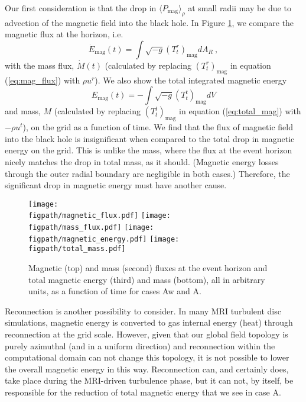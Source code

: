 \documentclass[useAMS,usenatbib]{mn2e}
\newcommand{\figpath}{.}
\def\pm{P_\mathrm{mag}}
\begin{document}
Our first consideration is that the drop in  $\langle \pm \rangle_\rho$ at small radii may be due to advection of the magnetic field into the black hole.  In Figure \ref{fig:fluxes}, we compare the magnetic flux at the horizon, i.e.
\begin{equation}
\dot{E}_\mathrm{mag}(t) = \int \sqrt{-g} (T^r_t)_\mathrm{mag} dA_R ~,
\label{eq:mag_flux}
\end{equation}
with the mass flux, $\dot{M}(t)$ (calculated by replacing $(T^r_t)_\mathrm{mag}$ in equation (\ref{eq:mag_flux}) with $\rho u^r$). We also show the total integrated magnetic energy 
\begin{equation}
E_\mathrm{mag}(t) = -\int \sqrt{-g} (T^t_t)_\mathrm{mag} dV
\label{eq:total_mag}
\end{equation}
and mass, $M$ (calculated by replacing $(T^t_t)_\mathrm{mag}$ in equation (\ref{eq:total_mag}) with $-\rho u^t$), on the grid as a function of time.  We find that the flux of magnetic field into the black hole is insignificant when compared to the total drop in magnetic energy on the grid.  This is unlike the mass, where the flux at the event horizon nicely matches the drop in total mass, as it should. (Magnetic energy losses through the outer radial boundary are negligible in both cases.)  Therefore, the significant drop in magnetic energy must have another cause.  

\begin{figure}
\centering
\texttt{[image: \\figpath/magnetic\_flux.pdf]}
\texttt{[image: \\figpath/mass\_flux.pdf]} 
\texttt{[image: \\figpath/magnetic\_energy.pdf]}
\texttt{[image: \\figpath/total\_mass.pdf]}
\caption{Magnetic (top) and mass (second) fluxes at the event horizon and total magnetic energy (third) and mass (bottom), all in arbitrary units, as a function of time for cases Aw and A.}
\label{fig:fluxes}
\end{figure}


Reconnection is another possibility to consider.  In many MRI turbulent disc simulations, magnetic energy is converted to gas internal energy (heat) through reconnection at the grid scale.  However, given that our global field topology is purely azimuthal (and in a uniform direction) and reconnection within the computational domain can not change this topology, it is not possible to lower the overall magnetic energy in this way.  Reconnection can, and certainly does, take place during the MRI-driven turbulence phase, but it can not, by itself, be responsible for the reduction of total magnetic energy that we see in case A. 
\end{document}
